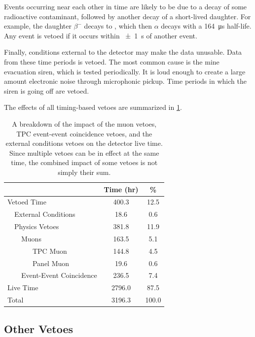 \documentclass[herrin-thesis.tex]{subfiles}
\begin{document}
Events occurring near each other in time are likely to be due to a decay of some radioactive contaminant, followed by another decay of a short-lived daughter. For example, the  daughter  \(\beta^{-}\) decays to , which then \(\alpha\) decays with a \SI{164}{\micro\s} half-life.  Any event is vetoed if it occurs within \SI{\pm1}{\s} of another event.

Finally, conditions external to the detector may make the data unusable. Data from these time periods is vetoed. The most common cause is the mine evacuation siren, which is tested periodically. It is loud enough to create a large amount electronic noise through microphonic pickup. Time periods in which the siren is going off are vetoed.

The effects of all timing-based vetoes are summarized in \cref{tab:analysis_veto_effects}.

\begin{table}[htb]
\centering
\caption[Impact of timing-based vetoes]{A breakdown of the impact of the muon vetoes, TPC event-event coincidence vetoes, and the external conditions vetoes on the detector live time. Since multiple vetoes can be in effect at the same time, the combined impact of some vetoes is not simply their sum.}
\label{tab:analysis_veto_effects}
\begin{tabular}{l l l l c c}\toprule
\multicolumn{4}{c}{}							&	Time (\si{hr})	&	\%	\\\midrule
\multicolumn{4}{l}{Vetoed Time}				&	400.3		&	12.5	\\
	&\multicolumn{3}{l}{External Conditions}		&	18.6			&	0.6	\\
	&\multicolumn{3}{l}{Physics Vetoes}			&	381.8		&	11.9	\\
	&&\multicolumn{2}{l}{Muons}				&	163.5		&	5.1	\\
	&&&TPC Muon							&	144.8		&	4.5	\\
	&&&Panel Muon						&	19.6			&	0.6	\\
	&&\multicolumn{2}{l}{Event-Event Coincidence}&	236.5		&	7.4	\\
\multicolumn{4}{l}{Live Time}					&	2796.0		&	87.5	\\\midrule
\multicolumn{4}{l}{Total}						&	3196.3		&	100.0\\\bottomrule
\end{tabular}
\end{table}

\subsection{Other Vetoes}
\end{document}
